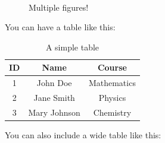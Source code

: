 \begin{figure}[ht]
	\centering
	 \\
	\caption{Multiple figures!}
\end{figure}

You can have a table like this:
\begin{table}[h!]
	\centering
	\label{tab:simple_table}
	\caption{A simple table}
	\begin{tabular}{|c|c|c|}
		\hline
		\textbf{ID} & \textbf{Name} & \textbf{Course} \\
		\hline
		1 & John Doe & Mathematics \\
		2 & Jane Smith & Physics \\
		3 & Mary Johnson & Chemistry \\
		\hline
	\end{tabular}
\end{table}

You can also include a wide table like this:


